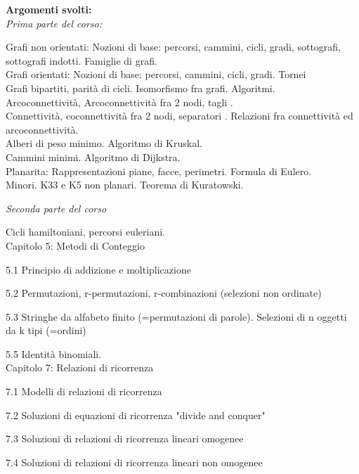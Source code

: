 \documentclass[12pt,a4paper]{article}
\begin{document}
















\begin{center}
\textbf{Argomenti svolti:} \\

\textit{Prima parte del corso:}
\begin{center}
Grafi non orientati: Nozioni di base: percorsi, cammini, cicli, gradi, sottografi, sottografi indotti. Famiglie di grafi. \\
Grafi orientati: Nozioni di base: percorsi, cammini, cicli, gradi. Tornei \\
Grafi bipartiti, parità di cicli. Isomorfismo fra grafi. Algoritmi. \\
Arcoconnettività, Arcoconnettività fra 2 nodi, tagli .\\
Connettività, coconnettività fra 2 nodi, separatori . Relazioni fra connettività ed arcoconnettività. \\
Alberi di peso minimo. Algoritmo di Kruskal.\\
Cammini minimi. Algoritmo di Dijkstra.\\
Planarita: Rappresentazioni piane, facce, perimetri. Formula di Eulero.\\
Minori. K33 e K5 non planari. Teorema di Kuratowski.
\end{center}

\textit{Seconda parte del corso} 
\begin{center}
Cicli hamiltoniani, percorsi euleriani.\\
Capitolo 5: Metodi di Conteggio\par
5.1 Principio di addizione e moltiplicazione\par
5.2 Permutazioni, r-permutazioni, r-combinazioni (selezioni non ordinate)\par
5.3 Stringhe da alfabeto finito (=permutazioni di parole). Selezioni di n oggetti da k tipi (=ordini)\par
5.5 Identità binomiali.\\
Capitolo 7: Relazioni di ricorrenza\par
7.1 Modelli di relazioni di ricorrenza\par
7.2 Soluzioni di equazioni di ricorrenza "divide and conquer"\par
7.3 Soluzioni di relazioni di ricorrenza lineari omogenee\par
7.4 Soluzioni di relazioni di ricorrenza lineari non omogenee
\end{center}
\end{center}
\end{document}
